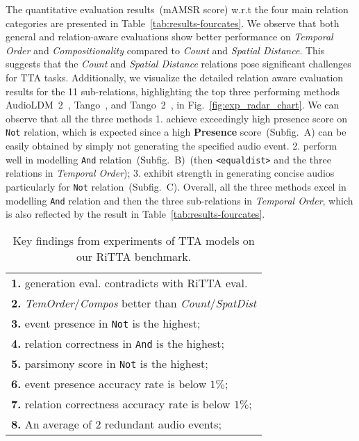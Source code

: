 The quantitative evaluation results~(mAMSR score) w.r.t the four main relation categories are presented in Table~\ref{tab:results-fourcates}. We observe that both general and relation-aware evaluations show better performance on \emph{Temporal Order} and \emph{Compositionality} compared to \emph{Count} and \emph{Spatial Distance}. This suggests that the \emph{Count} and \emph{Spatial Distance} relations pose significant challenges for TTA tasks. Additionally, we visualize the detailed relation aware evaluation results for the 11 sub-relations, highlighting the top three performing methods AudioLDM~2~\citep{audioldm2}, Tango~\citep{ghosal2023tango}, and Tango~2~\citep{ghosal2023tango2}, in Fig.~\ref{fig:exp_radar_chart}. We can observe that all the three methods 1. achieve exceedingly high presence score on \texttt{Not} relation, which is expected since a high \textbf{Presence} score~(Subfig.~A) can be easily obtained by simply not generating the specified audio event. 2. perform well in modelling \texttt{And} relation~(Subfig.~B)~(then \texttt{<equaldist>} and the three relations in \emph{Temporal Order}); 3. exhibit strength in generating concise audios particularly for \texttt{Not} relation~(Subfig.~C). Overall, all the three methods excel in modelling \texttt{And} relation and then the three sub-relations in \emph{Temporal Order}, which is also reflected by the result in Table~\ref{tab:results-fourcates}.

\begin{wraptable}{r}{5.4cm}
\scriptsize
\vspace{-2mm}
\begin{tabular}{l}
\toprule
\textbf{1.} generation eval. contradicts with RiTTA eval.\\
\textbf{2.} \emph{TemOrder}/\emph{Compos} better than \emph{Count}/\emph{SpatDist}\\
\textbf{3.} event presence in \texttt{Not} is the highest;\\
\textbf{4.} relation correctness in \texttt{And} is the highest;\\
\textbf{5.} parsimony score in \texttt{Not} is the highest;\\
\textbf{6.} event presence accuracy rate is below $1\%$; \\
\textbf{7.} relation correctness accuracy rate is below $1\%$;\\
\textbf{8.} An average of 2 redundant audio events;\\
\bottomrule
\end{tabular}
\vspace{-3mm}
\caption{\small Key findings from experiments of TTA models on our RiTTA benchmark.}
\label{tab:benchmark_findings}
\end{wraptable} 


